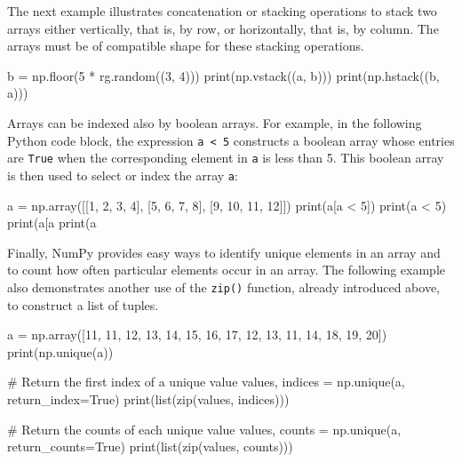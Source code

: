 The next example illustrates concatenation or stacking operations to stack two arrays either vertically, that is, by row, or horizontally, that is, by column. The arrays must be of compatible shape for these stacking operations. 

\begin{samepage}
\begin{pythoncode}
b = np.floor(5 * rg.random((3, 4)))
print(np.vstack((a, b)))
print(np.hstack((b, a)))
\end{pythoncode}
\end{samepage}

Arrays can be indexed also by boolean arrays. For example, in the following Python code block, the expression \texttt{a < 5} constructs a boolean array whose entries are \texttt{True} when the corresponding element in \texttt{a} is less than 5. This boolean array is then used to select or index the array \texttt{a}:

\begin{samepage}
\begin{pythoncode}
a = np.array([[1, 2, 3, 4], 
              [5, 6, 7, 8], 
              [9, 10, 11, 12]])
print(a[a < 5])
print(a < 5)
print(a[a%
print(a%
\end{pythoncode}
\end{samepage}

Finally, NumPy provides easy ways to identify unique elements in an array and to count how often particular elements occur in an array. The following example also demonstrates another use of the \texttt{zip()} function, already introduced above, to construct a list of tuples.

\begin{samepage}
\begin{pythoncode}
a = np.array([11, 11, 12, 13, 14, 15, 16, 
              17, 12, 13, 11, 14, 18, 19, 20])
print(np.unique(a))

# Return the first index of a unique value
values, indices = np.unique(a, return_index=True)
print(list(zip(values, indices)))

# Return the counts of each unique value
values, counts = np.unique(a, return_counts=True)
print(list(zip(values, counts)))
\end{pythoncode}
\end{samepage}

